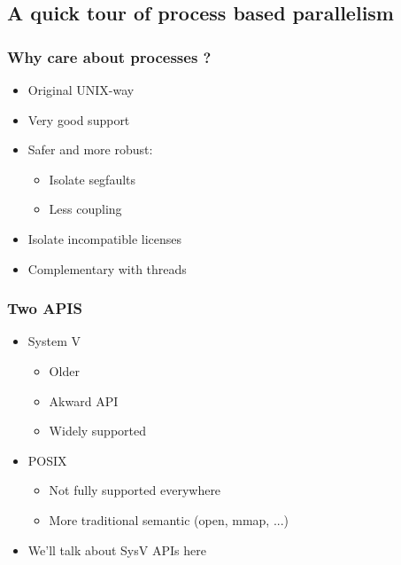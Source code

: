 













\subsection{A quick tour of process based parallelism}
\label{subsec:sysv}


\begin{frame}
  \frametitle{Why care about processes ?}

  \begin{itemize}
  \item Original UNIX-way
  \item Very good support
  \item Safer and more robust:
    \begin{itemize}
    \item Isolate segfaults
    \item Less coupling
    \end{itemize}
  \item Isolate incompatible licenses
  \item Complementary with threads
  \end{itemize}
\end{frame}


\begin{frame}
  \frametitle{Two APIS}

  \begin{itemize}
  \item System V
    \begin{itemize}
    \item Older
    \item Akward API
    \item Widely supported
    \end{itemize}
  \item POSIX
    \begin{itemize}
    \item Not fully supported everywhere
    \item More traditional semantic (open, mmap, ...)
    \end{itemize}
  \item We'll talk about SysV APIs here
  \end{itemize}
\end{frame}

